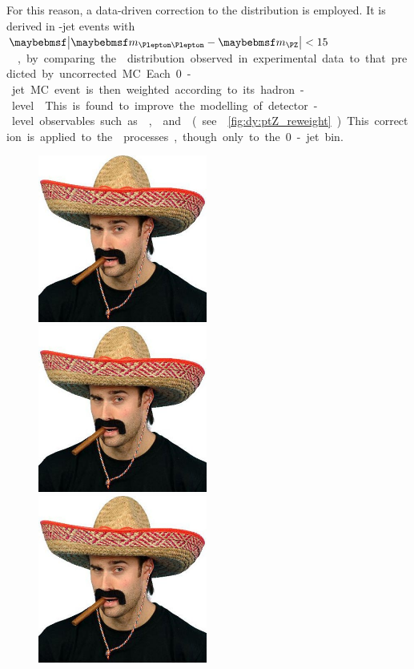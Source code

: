 For this reason, a data-driven correction to the \ptZ distribution is employed. It is 
derived in -jet events with \unit{$\mods{\mll - \mZ} < 15$}{\GeV}, by 
comparing the \ptll distribution observed in experimental data to that predicted by 
uncorrected MC. Each 0-jet MC event is then weighted according to its hadron-level \ptZ. 
This is found to improve the modelling of detector-level observables such as \ptll, 
\dphill and \ptleadlep (see \Figure~\ref{fig:dy:ptZ_reweight}). This correction is 
applied to the \HepProcess{\DY \HepTo \Pe\Pe/\Pmu\Pmu/\Ptau\Ptau} processes, though only 
to the 0-jet bin.

\begin{figure}[p]
	\includegraphics[width=0.495\textwidth]{tex/motivation/sombrero_comical}
	\hfill
	\includegraphics[width=0.495\textwidth]{tex/motivation/sombrero_comical}
	\\
	\includegraphics[width=0.495\textwidth]{tex/motivation/sombrero_comical}

\end{figure}
